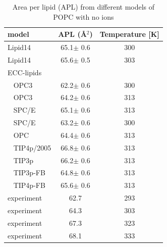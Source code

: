 \documentclass[aip,jcp,twocolumn]{revtex4}
\begin{document}
\begin{table}[tb!]
  \caption{Area per lipid (APL) from different models of POPC with no ions\label{tab:apls_si} }
  \begin{tabular}{l|c c}
    model          & APL (\AA$^2$)   & Temperature [K] \\
    \hline
    Lipid14                   & 65.1$\pm$ 0.6  &  300 \\
    Lipid14 \cite{dickson14}  & 65.6$\pm$ 0.5  &  303 \\
    \hline
    ECC-lipids &        &  \\
    ~ OPC3           & 62.2$\pm$ 0.6   &  300       \\
    ~ OPC3           & 64.2$\pm$ 0.6   &  313       \\
    ~ SPC/E          & 65.1$\pm$ 0.6   &  313       \\
    ~ SPC/E          & 63.2$\pm$ 0.6   &  300       \\
    ~ OPC            & 64.4$\pm$ 0.6   &  313       \\
    ~ TIP4p/2005     & 66.8$\pm$ 0.6   &  313       \\
    ~ TIP3p          & 66.2$\pm$ 0.6   &  313       \\
    ~ TIP3p-FB       & 64.8$\pm$ 0.6   &  313       \\
    ~ TIP4p-FB       & 65.6$\pm$ 0.6   &  313       \\
    \hline
    experiment   & 62.7  &  293    \\
    experiment \cite{kucerka11} & 64.3  &  303    \\
    experiment  & 67.3  &  323    \\
    experiment  & 68.1  &  333    \\
    \hline
  \end{tabular} \\
\end{table}
\end{document}
